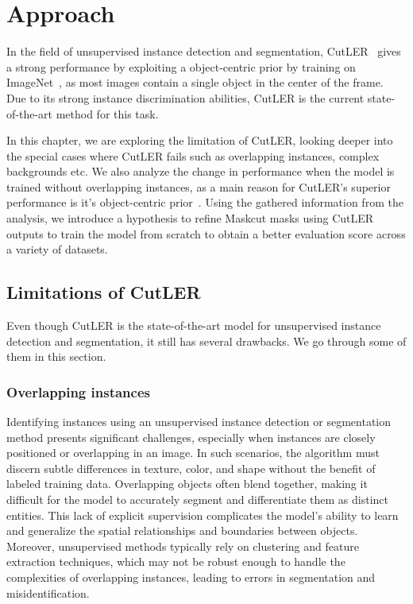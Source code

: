 \chapter{Approach}\label{chap:approach}

In the field of unsupervised instance detection and segmentation, CutLER~\cite{wang2023cut} gives a strong performance by exploiting a  object-centric prior by training on ImageNet~\cite{deng2009imagenet}, as most images contain a single
object in the center of the frame.  Due to its strong instance discrimination abilities, CutLER is the current state-of-the-art method for this task.

In this chapter, we are exploring the limitation of CutLER, looking deeper into the special cases where CutLER fails such as overlapping instances, complex backgrounds etc. We also analyze the change in performance when the model is trained without overlapping instances, as a main reason for CutLER's superior  performance is it's object-centric prior~\cite{engstler2023understanding}. Using the gathered information from the analysis, we introduce a hypothesis to refine Maskcut masks using CutLER outputs to train the model from scratch to obtain a better evaluation score across a variety of datasets.

\section{Limitations of CutLER}
Even though CutLER is the state-of-the-art model for unsupervised instance detection and segmentation, it still has several drawbacks. We go through some of them in this section.

\subsection{Overlapping instances}
Identifying instances using an unsupervised instance detection or segmentation method presents significant challenges, especially when instances are closely positioned or overlapping in an image. In such scenarios, the algorithm must discern subtle differences in texture, color, and shape without the benefit of labeled training data. Overlapping objects often blend together, making it difficult for the model to accurately segment and differentiate them as distinct entities. This lack of explicit supervision complicates the model's ability to learn and generalize the spatial relationships and boundaries between objects. Moreover, unsupervised methods typically rely on clustering and feature extraction techniques, which may not be robust enough to handle the complexities of overlapping instances, leading to errors in segmentation and misidentification. 

